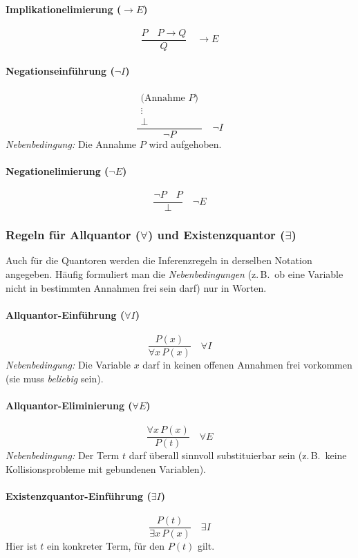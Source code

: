 \documentclass{book}
\theoremstyle{plain}
\theoremstyle{remark}
\theoremstyle{definition}
\begin{document}
\paragraph{Implikationelimierung ($\to E$)}
\[
\frac{P \quad P \to Q}{Q}
\quad \to E
\]

\paragraph{Negationseinführung ($\neg I$)}
\[
\frac{
\begin{array}{c}
\text{(Annahme }P\text{)} \\
\vdots \\
\bot
\end{array}
}{\neg P}
\quad \neg I
\]
\emph{Nebenbedingung:} Die Annahme $P$ wird aufgehoben.

\paragraph{Negationelimierung ($\neg E$)}
\[
\frac{\neg P \quad P}{\bot}
\quad \neg E
\]

\subsubsection{Regeln für Allquantor ($\forall$) und Existenzquantor ($\exists$)}

Auch für die Quantoren werden die Inferenzregeln in derselben Notation angegeben. Häufig formuliert man die \emph{Nebenbedingungen} (z.\,B.\ ob eine Variable nicht in bestimmten Annahmen frei sein darf) nur in Worten.

\paragraph{Allquantor-Einführung ($\forall I$)}
\[
\frac{P(x)}{\forall x\,P(x)}
\quad \forall I
\]
\emph{Nebenbedingung:} Die Variable $x$ darf in keinen offenen Annahmen frei vorkommen (sie muss \emph{beliebig} sein).

\paragraph{Allquantor-Eliminierung ($\forall E$)}
\[
\frac{\forall x\,P(x)}{P(t)}
\quad \forall E
\]
\emph{Nebenbedingung:} Der Term $t$ darf überall sinnvoll substituierbar sein (z.\,B.\ keine Kollisionsprobleme mit gebundenen Variablen).

\paragraph{Existenzquantor-Einführung ($\exists I$)}
\[
\frac{P(t)}{\exists x\,P(x)}
\quad \exists I
\]
Hier ist $t$ ein konkreter Term, für den $P(t)$ gilt.
\end{document}
